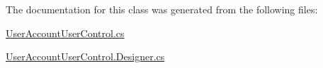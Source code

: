 The documentation for this class was generated from the following files\+:\begin{DoxyCompactItemize}
\item 
\hyperlink{_user_account_user_control_8cs}{User\+Account\+User\+Control.\+cs}\item 
\hyperlink{_user_account_user_control_8_designer_8cs}{User\+Account\+User\+Control.\+Designer.\+cs}\end{DoxyCompactItemize}
